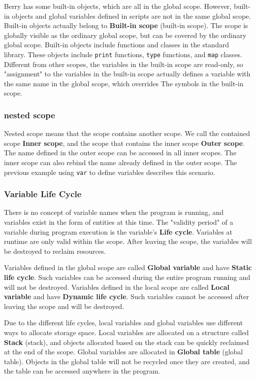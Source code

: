 Berry has some built-in objects, which are all in the global scope. However, built-in objects and global variables defined in scripts are not in the same global scope. Built-in objects actually belong to \textbf{Built-in scope} (built-in scope). The scope is globally visible as the ordinary global scope, but can be covered by the ordinary global scope. Built-in objects include functions and classes in the standard library. These objects include \texttt{print} functions, \texttt{type} functions, and \texttt{map} classes. Different from other scopes, the variables in the built-in scope are read-only, so "assignment" to the variables in the built-in scope actually defines a variable with the same name in the global scope, which overrides The symbols in the built-in scope.

\subsubsection {nested scope}

Nested scope means that the scope contains another scope. We call the contained scope \textbf{Inner scope}, and the scope that contains the inner scope \textbf{Outer scope}. The name defined in the outer scope can be accessed in all inner scopes. The inner scope can also rebind the name already defined in the outer scope. The previous example using \texttt{var} to define variables describes this scenario.

\subsubsection{Variable Life Cycle}

There is no concept of variable names when the program is running, and variables exist in the form of entities at this time. The "validity period" of a variable during program execution is the variable's \textbf{Life cycle}. Variables at runtime are only valid within the scope. After leaving the scope, the variables will be destroyed to reclaim resources.

Variables defined in the global scope are called \textbf{Global variable} and have \textbf{Static life cycle}. Such variables can be accessed during the entire program running and will not be destroyed. Variables defined in the local scope are called \textbf{Local variable} and have \textbf{Dynamic life cycle}. Such variables cannot be accessed after leaving the scope and will be destroyed.

Due to the different life cycles, local variables and global variables use different ways to allocate storage space. Local variables are allocated on a structure called \textbf{Stack} (stack), and objects allocated based on the stack can be quickly reclaimed at the end of the scope. Global variables are allocated in \textbf{Global table} (global table). Objects in the global table will not be recycled once they are created, and the table can be accessed anywhere in the program.

